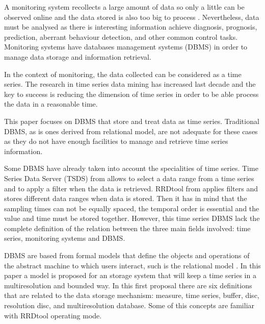 A monitoring system recollects a
large amount of data so only a little can be observed online and the
data stored is also too big to process \parencite{keogh97}. Nevertheless, data must be analysed as there is interesting information achieve  diagnosis, prognosis, prediction, aberrant behaviour detection, and other common control tasks. Monitoring systems have databases management systems (DBMS) in order to manage data storage and information retrieval. 


In the context of monitoring, the data collected can be considered as a time
series. The research in time series data mining has
increased last decade \parencite{fu11} and the key to success is
reducing the dimension of time series in order to be able process the
data in a reasonable time.

This paper focuses on DBMS that store and treat data as time series.
Traditional DBMS, as is ones derived from relational model, are not adequate for these cases as they do not have enough facilities to manage and retrieve time series information. 

Some DBMS have already taken into account the
specialities of time series.  Time Series Data Server (TSDS) from
\textcite{weigel10} allows to select a data range from a time series and
to apply a filter when the data is retrieved.  RRDtool from
\textcite{rrdtool} applies filters and stores different data ranges when
data is stored. Then it has in mind that the sampling times can not be
equally spaced, the temporal order is essential and the value and time
must be stored together. However, this time series DBMS lack the complete definition of the relation between the three main fields involved: time series, monitoring systems and DBMS.


DBMS are based from formal models that define
the objects and operations of the abstract machine to which users
interact, such is the relational model \parencite{date}. In this paper
a model is proposed for an storage system that will keep a time series
in a multiresolution and bounded way.  In this first proposal there
are six definitions that are related to the data storage mechanism:
measure, time series, buffer, disc, resolution disc, and multiresolution
database. Some of this concepts are familiar with RRDtool
operating mode.





